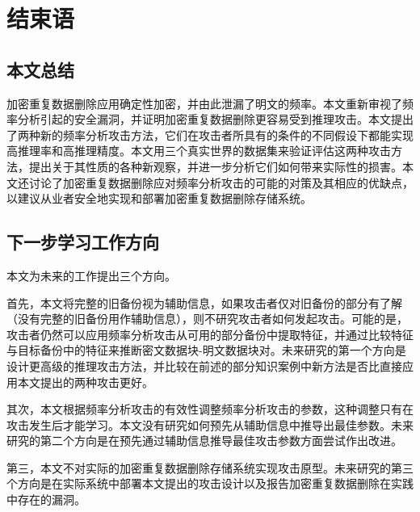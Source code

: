 \chapter{结束语}
\label{sec:Conclusion}

\section{本文总结}

加密重复数据删除应用确定性加密，并由此泄漏了明文的频率。本文重新审视了频率分析引起的安全漏洞，并证明加密重复数据删除更容易受到推理攻击。本文提出了两种新的频率分析攻击方法，它们在攻击者所具有的条件的不同假设下都能实现高推理率和高推理精度。本文用三个真实世界的数据集来验证评估这两种攻击方法，提出关于其性质的各种新观察，并进一步分析它们如何带来实际性的损害。本文还讨论了加密重复数据删除应对频率分析攻击的可能的对策及其相应的优缺点，以建议从业者安全地实现和部署加密重复数据删除存储系统。
     
\section{下一步学习工作方向}

本文为未来的工作提出三个方向。


首先，本文将完整的旧备份视为辅助信息，如果攻击者仅对旧备份的部分有了解（没有完整的旧备份用作辅助信息），则不研究攻击者如何发起攻击。可能的是，攻击者仍然可以应用频率分析攻击从可用的部分备份中提取特征，并通过比较特征与目标备份中的特征来推断密文数据块-明文数据块对。未来研究的第一个方向是设计更高级的推理攻击方法，并比较在前述的部分知识案例中新方法是否比直接应用本文提出的两种攻击更好。
      
      
\par 其次，本文根据频率分析攻击的有效性调整频率分析攻击的参数，这种调整只有在攻击发生后才能学习。本文没有研究如何预先从辅助信息中推导出最佳参数。未来研究的第二个方向是在预先通过辅助信息推导最佳攻击参数方面尝试作出改进。
 


第三，本文不对实际的加密重复数据删除存储系统实现攻击原型。未来研究的第三个方向是在实际系统中部署本文提出的攻击设计以及报告加密重复数据删除在实践中存在的漏洞。

